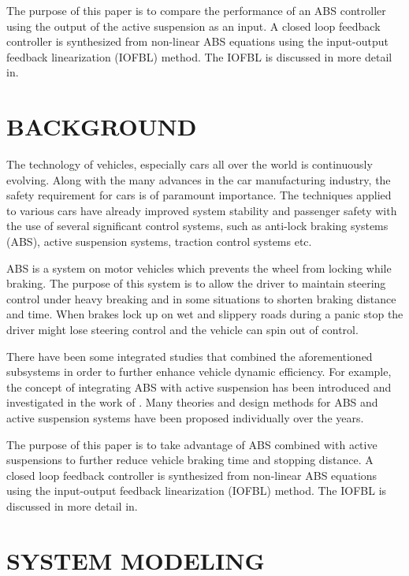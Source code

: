 \documentclass[10pt,twocolumn]{witseiepaper}
\begin{document}
The purpose of this paper is to compare the performance of an ABS controller using the output of the active suspension as an input. A closed loop feedback controller is synthesized from non-linear ABS equations using the input-output feedback linearization (IOFBL) method. The IOFBL is discussed in more detail in\cite{Nyandoro2:2011, Iraj:2008}.


\section{BACKGROUND}

The technology of vehicles, especially cars all over the world is continuously evolving. Along with the many advances in the car manufacturing industry, the safety requirement for cars is of paramount importance. The techniques applied to various cars have already improved system stability and passenger safety with the use of several significant control systems, such as anti-lock braking systems (ABS), active suspension systems, traction control systems etc.
 
ABS is a system on motor vehicles which prevents the wheel from locking while braking. The purpose of this system is to allow the driver to maintain steering control under heavy breaking and in some situations to shorten braking distance and time. When brakes lock up on wet and slippery roads during a panic stop the driver might lose steering control and the vehicle can spin out of control.

There have been some integrated studies that combined the aforementioned subsystems in order to further enhance vehicle dynamic efficiency. For example, the concept of integrating ABS with active suspension has been introduced and investigated in the work of \cite{Crolla:1988}. Many theories and design methods for ABS and active suspension systems have been proposed individually over the years. 

The purpose of this paper is to take advantage of ABS combined with active suspensions to further reduce vehicle braking time and stopping distance. A closed loop feedback controller is synthesized from non-linear ABS equations using the input-output feedback linearization (IOFBL) method. The IOFBL is discussed in more detail in\cite{Nyandoro2:2011, Iraj:2008}.

\section{SYSTEM MODELING}
\end{document}
